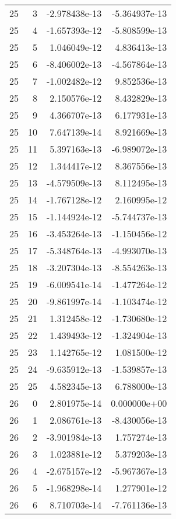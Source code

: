 \begin{tabular}{rrrr}
  25 &    3 & -2.978438e-13 & -5.364937e-13 \\
  25 &    4 & -1.657393e-12 & -5.808599e-13 \\
  25 &    5 &  1.046049e-12 &  4.836413e-13 \\
  25 &    6 & -8.406002e-13 & -4.567864e-13 \\
  25 &    7 & -1.002482e-12 &  9.852536e-13 \\
  25 &    8 &  2.150576e-12 &  8.432829e-13 \\
  25 &    9 &  4.366707e-13 &  6.177931e-13 \\
  25 &   10 &  7.647139e-14 &  8.921669e-13 \\
  25 &   11 &  5.397163e-13 & -6.989072e-13 \\
  25 &   12 &  1.344417e-12 &  8.367556e-13 \\
  25 &   13 & -4.579509e-13 &  8.112495e-13 \\
  25 &   14 & -1.767128e-12 &  2.160995e-12 \\
  25 &   15 & -1.144924e-12 & -5.744737e-13 \\
  25 &   16 & -3.453264e-13 & -1.150456e-12 \\
  25 &   17 & -5.348764e-13 & -4.993070e-13 \\
  25 &   18 & -3.207304e-13 & -8.554263e-13 \\
  25 &   19 & -6.009541e-14 & -1.477264e-12 \\
  25 &   20 & -9.861997e-14 & -1.103474e-12 \\
  25 &   21 &  1.312458e-12 & -1.730680e-12 \\
  25 &   22 &  1.439493e-12 & -1.324904e-13 \\
  25 &   23 &  1.142765e-12 &  1.081500e-12 \\
  25 &   24 & -9.635912e-13 & -1.539857e-13 \\
  25 &   25 &  4.582345e-13 &  6.788000e-13 \\
  26 &    0 &  2.801975e-14 &  0.000000e+00 \\
  26 &    1 &  2.086761e-13 & -8.430056e-13 \\
  26 &    2 & -3.901984e-13 &  1.757274e-13 \\
  26 &    3 &  1.023881e-12 &  5.379203e-13 \\
  26 &    4 & -2.675157e-12 & -5.967367e-13 \\
  26 &    5 & -1.968298e-14 &  1.277901e-12 \\
  26 &    6 &  8.710703e-14 & -7.761136e-13 \\

\end{tabular}

